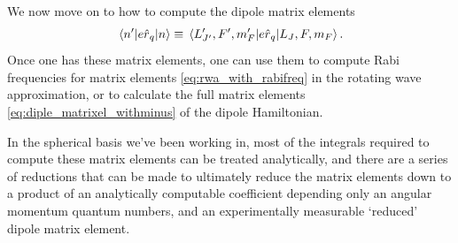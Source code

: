 We now move on to how to compute the dipole matrix elements
\begin{align}
\matrixel{n^\prime}{e\hat r_q}{n} \equiv \matrixel{L^\prime_{J^\prime}, F^\prime, m_F^\prime}{e\hat r_q}{L_J, F, m_F}.
\end{align}
Once one has these matrix elements, one can use them to compute Rabi frequencies for matrix elements \eqref{eq:rwa_with_rabifreq} in the rotating wave approximation, or to calculate the full matrix elements \eqref{eq:diple_matrixel_withminus} of the dipole Hamiltonian.

In the spherical basis we've been working in, most of the integrals required to compute these matrix elements can be treated analytically, and there are a series of reductions that can be made to ultimately reduce the matrix elements down to a product of an analytically computable coefficient depending only an angular momentum quantum numbers, and an experimentally measurable `reduced' dipole matrix element.

